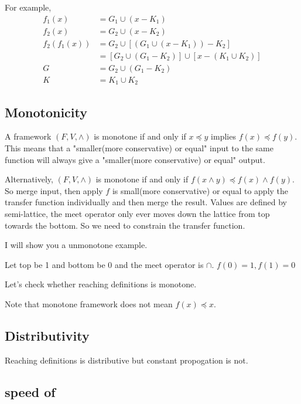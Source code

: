 For example, 
\begin{align*} 
    f_1(x) &= G_1 \cup (x - K_1)\\
    f_2(x) &= G_2 \cup (x - K_2) \\
    f_2(f_1(x)) &= G_2 \cup [(G_1 \cup (x - K_1)) - K_2] \\
    & = [G_2 \cup (G_1 - K_2)] \cup [x-(K_1 \cup K_2)] \\
    G &= G_2 \cup (G_1 - K_2) \\
    K &= K_1 \cup K_2
\end{align*}


\subsection{Monotonicity}


A framework \((F,V,\wedge)\) is monotone if and only if \(x \preceq y \) implies \(f(x) \preceq f(y)\). This means that
a "smaller(more conservative) or equal" input to the same function will always give a "smaller(more conservative)  or equal" output.



Alternatively, \((F,V,\wedge)\) is monotone if and only if \(  f(x \wedge y) \preceq f(x) \wedge f(y)\). So  merge input, then apply \(f\) is small(more conservative)  or equal to apply the transfer
function individually and then merge the result. Values are defined by semi-lattice, the meet operator only ever moves down the lattice from top towards the bottom. 
So we need to constrain the transfer function.

I will show you a unmonotone example.

Let top be 1 and bottom be 0 and the meet operator is \(\cap\). \(f(0) = 1, f(1) = 0\)


Let's check whether reaching definitions is monotone.


Note that monotone framework does not mean \(f(x) \preceq  x\).



\subsection{Distributivity}

Reaching definitions is distributive but constant propogation is not.



\subsection{speed of }

